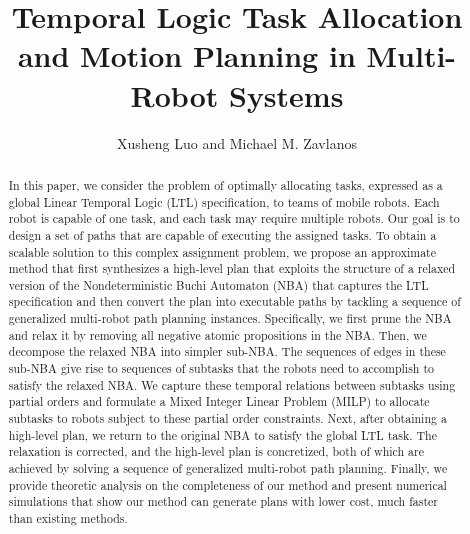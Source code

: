 \documentclass[Afour,sageh,times]{sagej}
\begin{document}

\author{Xusheng Luo and Michael M. Zavlanos}




\title{Temporal Logic Task Allocation and Motion Planning in Multi-Robot Systems}

\begin{abstract}
 In this paper, we consider the problem of optimally allocating tasks, expressed as a global Linear Temporal Logic (LTL) specification, to teams of mobile robots. Each robot is capable of one task, and each task may require multiple robots. Our goal is to design a set of paths that are capable of executing the assigned tasks. To obtain a scalable solution to this complex assignment problem, we propose an approximate method that first synthesizes a high-level plan that exploits the structure of a relaxed version of the Nondeterministic Buchi Automaton (NBA) that captures the LTL specification and then convert the plan into executable paths by tackling a sequence of generalized multi-robot path planning instances. Specifically, we first prune the NBA and relax it by removing all negative atomic propositions in the NBA. Then, we decompose the relaxed NBA into simpler sub-NBA. The sequences of edges in these sub-NBA give rise to sequences of subtasks that the robots need to accomplish to satisfy the relaxed NBA. We capture these temporal relations between subtasks using partial orders and formulate a Mixed Integer Linear Problem (MILP) to allocate subtasks to robots subject to these partial order constraints. Next, after obtaining a high-level plan, we return to the original NBA to satisfy the global LTL task. The relaxation is corrected, and the high-level plan is concretized, both of which are achieved by solving a sequence of generalized multi-robot path planning. Finally, we provide theoretic analysis on the completeness of our method and present numerical simulations that show our method can generate plans with lower cost, much faster than existing methods.

\end{abstract}

\maketitle
\end{document}
